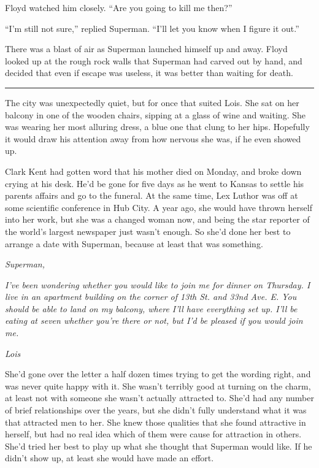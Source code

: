 \documentclass[ebook,12pt]{memoir}
\begin{document}
Floyd watched him closely. ``Are you going to kill me then?''

``I'm still not sure,'' replied Superman. ``I'll let you know when I
figure it out.''

There was a blast of air as Superman launched himself up and away. Floyd
looked up at the rough rock walls that Superman had carved out by hand,
and decided that even if escape was useless, it was better than waiting
for death.

\begin{center}\rule{0.5\linewidth}{0.5pt}\end{center}

The city was unexpectedly quiet, but for once that suited Lois. She sat
on her balcony in one of the wooden chairs, sipping at a glass of wine
and waiting. She was wearing her most alluring dress, a blue one that
clung to her hips. Hopefully it would draw his attention away from how
nervous she was, if he even showed up.

Clark Kent had gotten word that his mother died on Monday, and broke
down crying at his desk. He'd be gone for five days as he went to Kansas
to settle his parents affairs and go to the funeral. At the same time,
Lex Luthor was off at some scientific conference in Hub City. A year
ago, she would have thrown herself into her work, but she was a changed
woman now, and being the star reporter of the world's largest newspaper
just wasn't enough. So she'd done her best to arrange a date with
Superman, because at least that was something.

\emph{Superman,}

\emph{I've been wondering whether you would like to join me for dinner
on Thursday. I live in an apartment building on the corner of 13th St.
and 33nd Ave. E. You should be able to land on my balcony, where I'll
have everything set up. I'll be eating at seven whether you're there or
not, but I'd be pleased if you would join me.}

\emph{Lois}

She'd gone over the letter a half dozen times trying to get the wording
right, and was never quite happy with it. She wasn't terribly good at
turning on the charm, at least not with someone she wasn't actually
attracted to. She'd had any number of brief relationships over the
years, but she didn't fully understand what it was that attracted men to
her. She knew those qualities that she found attractive in herself, but
had no real idea which of them were cause for attraction in others.
She'd tried her best to play up what she thought that Superman would
like. If he didn't show up, at least she would have made an effort.
\end{document}
